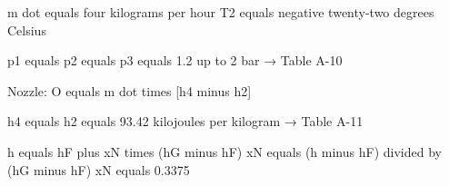 m dot equals four kilograms per hour  
T2 equals negative twenty-two degrees Celsius  

p1 equals p2 equals p3 equals 1.2 up to 2 bar → Table A-10  

Nozzle: O equals m dot times [h4 minus h2]  

h4 equals h2 equals 93.42 kilojoules per kilogram → Table A-11  

h equals hF plus xN times (hG minus hF)  
xN equals (h minus hF) divided by (hG minus hF)  
xN equals 0.3375